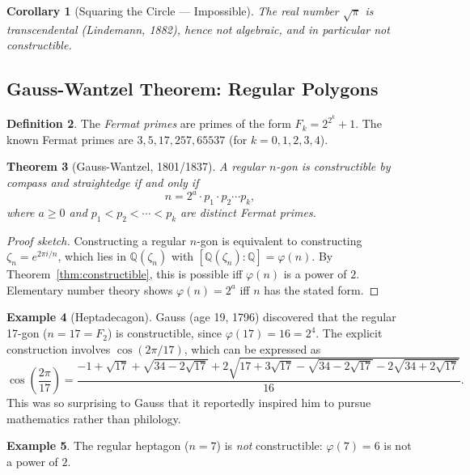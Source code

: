 \documentclass[12pt,a4paper]{amsart}
\newtheorem{theorem}{Theorem}[section]
\newtheorem{corollary}[theorem]{Corollary}
\theoremstyle{definition}
\newtheorem{definition}[theorem]{Definition}
\newtheorem{example}[theorem]{Example}
\newcommand{\Q}{\mathbb{Q}}
\begin{document}
\begin{corollary}[Squaring the Circle — Impossible]
The real number $\sqrt{\pi}$ is transcendental (Lindemann, 1882), hence not
algebraic, and in particular not constructible.
\end{corollary}

\subsection{Gauss-Wantzel Theorem: Regular Polygons}

\begin{definition}
The \emph{Fermat primes} are primes of the form $F_k = 2^{2^k} + 1$.
The known Fermat primes are $3, 5, 17, 257, 65537$ (for $k = 0,1,2,3,4$).
\end{definition}

\begin{theorem}[Gauss-Wantzel, 1801/1837]
\label{thm:gausswantzel}
A regular $n$-gon is constructible by compass and straightedge if and only if
\[
  n = 2^a \cdot p_1 \cdot p_2 \cdots p_k,
\]
where $a \geq 0$ and $p_1 < p_2 < \cdots < p_k$ are distinct Fermat primes.
\end{theorem}

\begin{proof}[Proof sketch]
Constructing a regular $n$-gon is equivalent to constructing $\zeta_n = e^{2\pi i/n}$,
which lies in $\Q(\zeta_n)$ with $[\Q(\zeta_n):\Q] = \varphi(n)$.
By Theorem~\ref{thm:constructible}, this is possible iff $\varphi(n)$ is a
power of $2$. Elementary number theory shows $\varphi(n) = 2^a$ iff $n$ has
the stated form.
\end{proof}

\begin{example}[Heptadecagon]
Gauss (age 19, 1796) discovered that the regular 17-gon ($n = 17 = F_2$)
is constructible, since $\varphi(17) = 16 = 2^4$. The explicit construction
involves $\cos(2\pi/17)$, which can be expressed as
\[
  \cos\!\left(\frac{2\pi}{17}\right)
  = \frac{-1 + \sqrt{17} + \sqrt{34 - 2\sqrt{17}}
    + 2\sqrt{17 + 3\sqrt{17} - \sqrt{34-2\sqrt{17}} - 2\sqrt{34+2\sqrt{17}}}}{16}.
\]
This was so surprising to Gauss that it reportedly inspired him to pursue
mathematics rather than philology.
\end{example}

\begin{example}
The regular heptagon ($n = 7$) is \emph{not} constructible: $\varphi(7) = 6$
is not a power of $2$.
\end{example}
\end{document}
